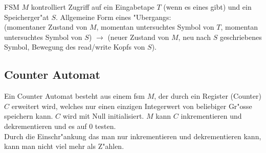 \documentclass[german, 10pt, a4paper, twocolumn]{scrartcl}
\theoremstyle{definition}
\theoremstyle{example}
\begin{document}
FSM $M$ kontrolliert Zugriff auf ein Eingabetape $T$ (wenn es eines gibt) und ein Speicherger"at $S$. Allgemeine Form eines "Ubergangs:\\
(momentaner Zustand von $M$, momentan untersuchtes Symbol von $T$, momentan untersuchtes Symbol von $S$) $\rightarrow$ (neuer Zustand von $M$, neu nach $S$ geschriebenes Symbol, Bewegung des read/write Kopfs von $S$).

\subsection{Counter Automat}

Ein Counter Automat besteht aus einem fsm $M$, der durch ein Register (Counter) $C$ erweitert wird, welches nur einen einzigen Integerwert von beliebiger Gr"osse speichern kann. $C$ wird mit Null initialisiert. $M$ kann $C$ inkrementieren und dekrementieren und es auf 0 testen.\\

Durch die Einschr"ankung das man nur inkrementieren und dekrementieren kann, kann man nicht viel mehr als Z"ahlen.
\end{document}
